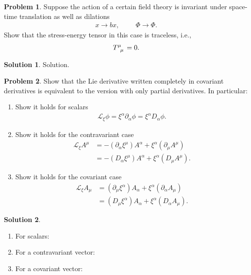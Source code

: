 \documentclass{book}
\numberwithin{equation}{section}
\theoremstyle{definition}
\newtheorem{prob}{Problem}[section]
\newtheorem{sln}{Solution}[section]
\newcommand{\p}{\partial}
\newcommand{\lag}{\mathcal{L}}
\newcommand{\nn}{\nonumber}
\begin{document}
\newpage



\begin{prob}
	Suppose the action of a certain field theory is invariant under space-time translation as well as dilations
	\begin{align}
	x\to bx,\hspace{1cm} \Phi \to \Phi.
	\end{align}
	Show that the stress-energy tensor in this case is traceless, i.e.,
	\begin{align}
	\tensor{T}{^\mu_\mu} = 0.
	\end{align}
	
	\begin{sln}
		Solution.
	\end{sln}
\end{prob}





\newpage




\begin{prob}
	Show that the Lie derivative written completely in covariant derivatives is equivalent to the version with only partial derivatives. In particular:
	\begin{enumerate}
		\item Show it holds for scalars
		\begin{align}
		\lag_\xi \phi = \xi^\alpha \p_\alpha \phi = \xi^\alpha D_\alpha \phi.
		\end{align}
		
		
		\item Show it holds for the contravariant case
		\begin{align}
		\lag_\xi A^\mu&= -(\p_\alpha \xi^\mu)A^\alpha + \xi^\alpha (\p_\mu A^\mu)\nn\\&= -(D_\alpha \xi^\mu)A^\alpha + \xi^\alpha (D_\mu A^\mu).
		\end{align}
		
		
		\item Show it holds for the covariant case
		\begin{align}
		\lag_\xi A_\mu &= (\p_\mu \xi^\alpha)A_\alpha + \xi^\alpha (\p_\alpha A_\mu)\nn\\
		& = (D_\mu \xi^\alpha)A_\alpha + \xi^\alpha (D_\alpha A_\mu).
		\end{align}
	\end{enumerate}
	
	
	\begin{sln}
		$\,$
		\begin{enumerate}
			\item For scalars:
			
			
			
			
			
			\item For a contravariant vector:
			
			
			
			
			
			\item For a covariant vector:
		\end{enumerate}
	\end{sln}
\end{prob}
\end{document}
